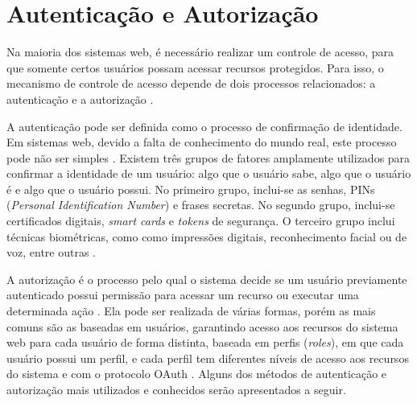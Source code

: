 \section{Autenticação e Autorização}

Na maioria dos sistemas web, é necessário realizar um controle de acesso, para que somente
certos usuários possam acessar recursos protegidos. Para isso, o mecanismo  de controle de
acesso depende de dois processos relacionados: a autenticação e a autorização
\cite{SULLIVAN2011}.

A autenticação pode ser definida como o processo de confirmação de identidade. Em sistemas web,
devido a falta de conhecimento do mundo real, este processo pode não ser simples
\cite{CHAPMAN2012}. Existem três grupos de fatores amplamente utilizados para confirmar a
identidade de um usuário: algo que o usuário sabe, algo que o usuário é e algo que o usuário
possui. No primeiro grupo, inclui-se as senhas, PINs (\emph{Personal Identification Number}) e
frases secretas. No segundo grupo, inclui-se certificados digitais, \emph{smart cards} e
\emph{tokens} de segurança. O terceiro grupo inclui técnicas biométricas, como como impressões
digitais, reconhecimento facial ou de voz, entre outras \cite{SULLIVAN2011}.

A autorização é o processo pelo qual o sistema decide se um usuário previamente autenticado
possui permissão para acessar um recurso ou executar uma determinada ação \cite{SPILCA2020}. Ela 
pode ser realizada de várias formas, porém as mais comuns são as baseadas em usuários, garantindo 
acesso aos recursos do sistema web para cada usuário de forma distinta, baseada em perfis 
(\emph{roles}), em que cada usuário possui um perfil, e cada perfil tem diferentes níveis de acesso 
aos recursos do sistema e com o protocolo OAuth \cite{CHAPMAN2012}. Alguns dos métodos de 
autenticação e autorização mais utilizados e conhecidos serão apresentados a seguir.
